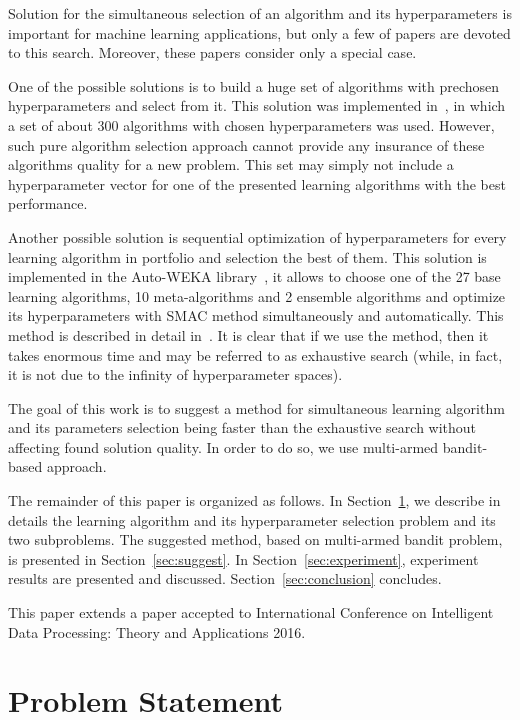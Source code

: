 \documentclass{svproc}
\begin{document}
Solution for the simultaneous selection of an algorithm and its hyperparameters is important for machine learning applications, but only a few of papers are devoted to this search. Moreover, these papers consider only a special case. 

One of the possible solutions is to build a huge set of algorithms with prechosen hyperparameters and select from it. This solution was implemented in~\cite{cashmeta1}, in which a set of about 300 algorithms with chosen hyperparameters was used. However, such pure algorithm selection approach cannot provide any insurance of these algorithms quality for a new problem. This set may simply not include a hyperparameter vector for one of the presented learning algorithms with the best performance.

Another possible solution is sequential optimization of hyperparameters for every learning algorithm in portfolio and selection the best of them. This solution is implemented in the Auto-WEKA library~\cite{autowekap}, it allows to choose one of the 27 base learning algorithms, 10 meta-algorithms and 2 ensemble algorithms and optimize its hyperparameters with SMAC method simultaneously and automatically. This method is described in detail in~\cite{autowekap}. It is clear that if we use the method, then it takes enormous time and may be referred to as exhaustive search (while, in fact, it is not due to the infinity of hyperparameter spaces).

The goal of this work is to suggest a method for simultaneous learning algorithm and its parameters selection being faster than the exhaustive search without affecting found solution quality. In order to do so, we use multi-armed bandit-based approach.

The remainder of this paper is organized as follows. In Section~\ref{sec:problem}, we describe in details the learning algorithm and its hyperparameter selection problem and its two subproblems. The suggested method, based on multi-armed bandit problem, is presented in Section~\ref{sec:suggest}. In Section~\ref{sec:experiment}, experiment results are presented and discussed. Section~\ref{sec:conclusion} concludes.

This paper extends a paper accepted to International Conference on Intelligent Data Processing: Theory and Applications 2016.

\section{Problem Statement}
\label{sec:problem}
\end{document}
